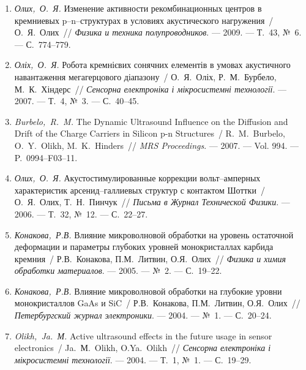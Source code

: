 \begin{enumerate}[label=\arabic*.,leftmargin=1cm,itemindent=0cm]
\item
\emph{Олих,~О.~Я.} Изменение активности
  рекомбинационных центров в кремниевых
  p--n--структурах в условиях акустического
  нагружения~/ О.~Я.~Олих~// \emph{Физика и
  техника полупроводников}. ---
  2009. ---
  Т.~43, {№}~6. ---
  {С.}~774--779.

\item
\emph{Оліх,~О.~Я.} Робота кремнієвих сонячних
  елементів в умовах акустичного
  навантаження мегагерцового діапазону~/
  О.~Я.~Оліх, Р.~М.~Бурбело, М.~К.~Хіндерс~//
  \emph{Сенсорна електроніка і
  мікросистемні технології}. ---
  2007. ---
  Т.~4, {№}~3. ---
  {С.}~40--45.

\item
\emph{Burbelo,~R.~M.} The Dynamic Ultrasound Influence on the Diffusion
  and Drift of the Charge Carriers in Silicon p-n Structures~/
  R.~M.~Burbelo, O.~Y.~Olikh, M.~K.~Hinders~// \emph{MRS
  Proceedings}. ---
 2007. ---
Vol. 994. ---
P.~0994–F03--11.

\item
\emph{Олих,~О.~Я.} Акустостимулированные
  коррекции вольт--амперных характеристик
  арсенид--галлиевых структур с контактом
  {Ш}оттки~/ О.~Я.~Олих, Т.~Н.~Пинчук~//
  \emph{Письма в Журнал Технической Физики}.
  ---
  2006. ---
  Т.~32, {№}~12. ---
  {С.}~22--27.

\item
\emph{Конакова,~Р.В.} Влияние микроволновой
  обработки на уровень остаточной
  деформации и параметры глубоких уровней
  монокристаллах карбида кремния~/
  Р.В.~Конакова, П.М.~Литвин, О.Я.~Олих~//
  \emph{Физика и химия обработки материалов}.
  ---
  2005. ---
  {№}~2. ---
  {С.}~19--22.


\item
\emph{Конакова,~Р.В.} Влияние микроволновой
  обработки на глубокие уровни
  монокристаллов {G}a{A}s и {S}i{C}~/ Р.В.~Конакова,
  П.М.~Литвин, О.Я.~Олих~// \emph{Петербургский
  журнал электроники}. ---
  2004. ---
  {№}~1. ---
  {С.}~20--24.

\item
\emph{Olikh,~Ja.~М.} Active ultrasound effects in the future usage in
  sensor electronics~/ Ja.~М.~Olikh, O.Ya.~Olikh~// \emph{Сенсорна
  електроніка і мікросистемні технології}.
  ---
  2004. ---
  Т.~1, {№}~1. ---
  {С.}~19--29.


\end{enumerate}
